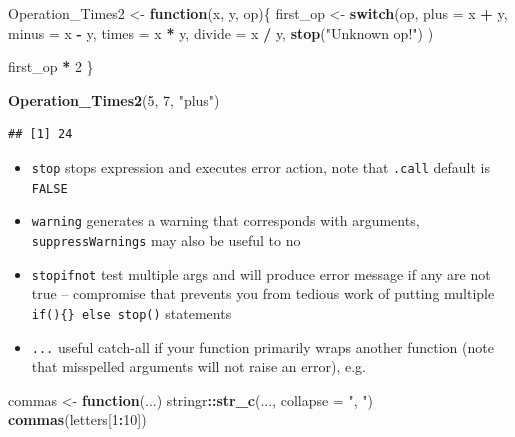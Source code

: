\documentclass[]{book}
\newenvironment{Shaded}{\begin{snugshade}}{\end{snugshade}}
\newcommand{\ControlFlowTok}[1]{\textcolor[rgb]{0.13,0.29,0.53}{\textbf{#1}}}
\newcommand{\DataTypeTok}[1]{\textcolor[rgb]{0.13,0.29,0.53}{#1}}
\newcommand{\DecValTok}[1]{\textcolor[rgb]{0.00,0.00,0.81}{#1}}
\newcommand{\KeywordTok}[1]{\textcolor[rgb]{0.13,0.29,0.53}{\textbf{#1}}}
\newcommand{\NormalTok}[1]{#1}
\newcommand{\OperatorTok}[1]{\textcolor[rgb]{0.81,0.36,0.00}{\textbf{#1}}}
\newcommand{\StringTok}[1]{\textcolor[rgb]{0.31,0.60,0.02}{#1}}
\providecommand{\tightlist}{%
  \setlength{\itemsep}{0pt}\setlength{\parskip}{0pt}}
\theoremstyle{definition}
\theoremstyle{definition}
\theoremstyle{definition}
\theoremstyle{remark}
\begin{document}
\begin{Shaded}
\begin{Highlighting}[]
\NormalTok{Operation_Times2 <-}\StringTok{ }\ControlFlowTok{function}\NormalTok{(x, y, op)\{}
\NormalTok{   first_op <-}\StringTok{ }\ControlFlowTok{switch}\NormalTok{(op,}
     \DataTypeTok{plus =}\NormalTok{ x }\OperatorTok{+}\StringTok{ }\NormalTok{y,}
     \DataTypeTok{minus =}\NormalTok{ x }\OperatorTok{-}\StringTok{ }\NormalTok{y,}
     \DataTypeTok{times =}\NormalTok{ x }\OperatorTok{*}\StringTok{ }\NormalTok{y,}
     \DataTypeTok{divide =}\NormalTok{ x }\OperatorTok{/}\StringTok{ }\NormalTok{y,}
     \KeywordTok{stop}\NormalTok{(}\StringTok{"Unknown op!"}\NormalTok{)}
\NormalTok{   )}
   
\NormalTok{   first_op }\OperatorTok{*}\StringTok{ }\DecValTok{2}
\NormalTok{  \}}

\KeywordTok{Operation_Times2}\NormalTok{(}\DecValTok{5}\NormalTok{, }\DecValTok{7}\NormalTok{, }\StringTok{"plus"}\NormalTok{)}
\end{Highlighting}
\end{Shaded}

\begin{verbatim}
## [1] 24
\end{verbatim}

\begin{itemize}
\tightlist
\item
  \texttt{stop} stops expression and executes error action, note that
  \texttt{.call} default is \texttt{FALSE}
\item
  \texttt{warning} generates a warning that corresponds with arguments,
  \texttt{suppressWarnings} may also be useful to no
\item
  \texttt{stopifnot} test multiple args and will produce error message
  if any are not true -- compromise that prevents you from tedious work
  of putting multiple \texttt{if()\{\}\ else\ stop()} statements
\item
  \texttt{...} useful catch-all if your function primarily wraps another
  function (note that misspelled arguments will not raise an error),
  e.g.~
\end{itemize}

\begin{Shaded}
\begin{Highlighting}[]
\NormalTok{commas <-}\StringTok{ }\ControlFlowTok{function}\NormalTok{(...) stringr}\OperatorTok{::}\KeywordTok{str_c}\NormalTok{(..., }\DataTypeTok{collapse =} \StringTok{", "}\NormalTok{)}
\KeywordTok{commas}\NormalTok{(letters[}\DecValTok{1}\OperatorTok{:}\DecValTok{10}\NormalTok{])}
\end{Highlighting}
\end{Shaded}
\end{document}
